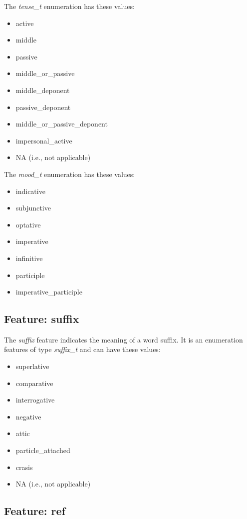 \documentclass[11pt,oneside,a4paper]{memoir}
\begin{document}
The \emph{tense\_t} enumeration has these values:

\begin{itemize}
\item active
\item middle
\item passive
\item middle\_or\_passive
\item middle\_deponent
\item passive\_deponent
\item middle\_or\_passive\_deponent
\item impersonal\_active
\item NA (i.e., not applicable)
\end{itemize}

The \emph{mood\_t} enumeration has these values:

\begin{itemize}
\item indicative
\item subjunctive
\item optative
\item imperative
\item infinitive
\item participle
\item imperative\_participle
\end{itemize}


\subsection{Feature: suffix}

The \emph{suffix} feature indicates the meaning of a word suffix. It is an enumeration features of
type \emph{suffix\_t} and can have these values:

\begin{itemize}
\item superlative
\item comparative
\item interrogative
\item negative
\item attic
\item particle\_attached
\item crasis
\item NA (i.e., not applicable)
\end{itemize}

\subsection{Feature: ref}
\end{document}
